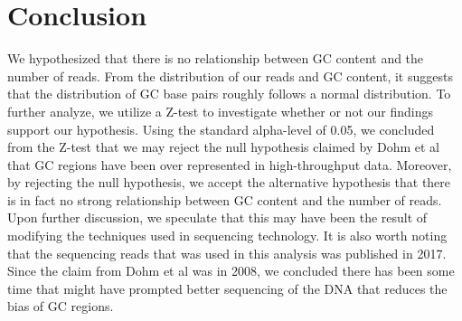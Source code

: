 \documentclass[12pt]{article}
\begin{document}
\newpage

\section{Conclusion}
We hypothesized that there is no relationship between GC content and the number of reads. From the distribution of our reads and GC content, it suggests that the distribution of GC base pairs roughly follows a normal distribution. To further analyze, we utilize a Z-test to investigate whether or not our findings support our hypothesis. Using the standard alpha-level of 0.05, we concluded from the Z-test that we may reject the null hypothesis claimed by Dohm et al that GC regions have been over represented in high-throughput data. Moreover, by rejecting the null hypothesis, we accept the alternative hypothesis that there is in fact no strong relationship between GC content and the number of reads. Upon further discussion, we speculate that this may have been the result of modifying the techniques used in sequencing technology. It is also worth noting that the sequencing reads that was used in this analysis was published in 2017. Since the claim from Dohm et al was in 2008, we concluded there has been some time that might have prompted better sequencing of the DNA that reduces the bias of GC regions.
\end{document}
